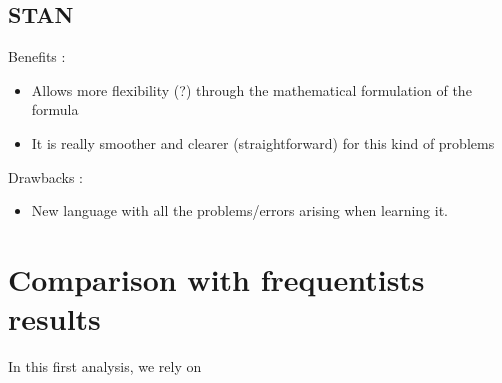 \subsection{STAN}

Benefits : 

\begin{itemize}
	\item Allows more flexibility (?) through the mathematical formulation of the formula
	\item It is really smoother and clearer (straightforward) for this kind of problems 
\end{itemize}

Drawbacks : 

\begin{itemize}
	\item New language with all the problems/errors arising when learning it. 
\end{itemize}



\section{Comparison with frequentists results}

In this first analysis, we rely on 
